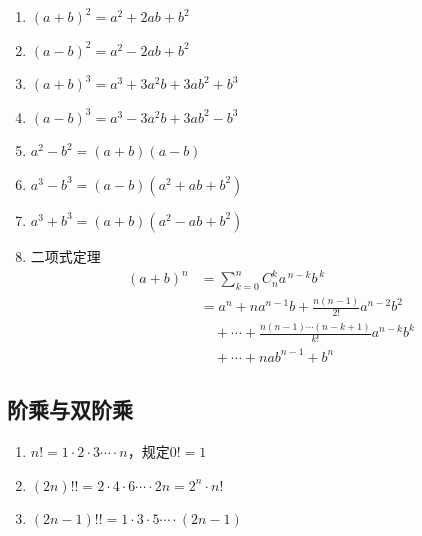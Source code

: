 \documentclass[../book.tex]{subfiles}
\begin{document}
\begin{enumerate}
    \item $(a + b)^2 = a^2 + 2ab + b^2$
    \item $(a - b)^2 = a^2 - 2ab + b^2$
    \item $(a + b)^3 = a^3 + 3a^{2}b + 3ab^2 + b^3$
    \item $(a - b)^3 = a^3 - 3a^{2}b + 3ab^2 - b^3$
    \item $a^2 - b^2 = (a + b)(a - b)$
    \item $a^3 - b^3 = (a - b)(a^2 + ab + b^2)$
    \item $a^3 + b^3 = (a + b)(a^2 - ab + b^2)$
    \item 二项式定理
    \[
        \begin{aligned}
        (a+b)
            ^n
            &= \sum_{k=0}^{n} C_n^k a^{\,n-k} b^{\,k} \\
            &= a^n
            + n a^{n-1} b
            + \frac{n(n-1)}{2!} a^{n-2} b^2 \\
            &\quad + \cdots
            + \frac{n(n-1)\cdots(n-k+1)}{k!} a^{n-k} b^k \\
            &\quad + \cdots
            + n a b^{n-1}
            + b^n
        \end{aligned}
    \]
\end{enumerate}

\subsection{阶乘与双阶乘}

\begin{enumerate}
    \item $n! = 1\cdot 2\cdot 3\cdots \cdot n$，规定$0! = 1$
    \item $(2n)!! = 2\cdot 4\cdot 6\cdots \cdot 2n = 2^n\cdot n! $
    \item $(2n - 1)!! = 1\cdot 3\cdot 5\cdots \cdot (2n - 1) $
\end{enumerate}
\end{document}
